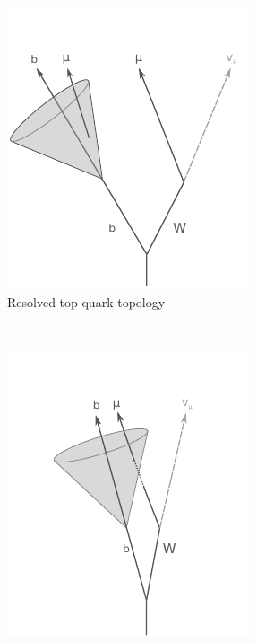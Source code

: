 \begin{figure}[htbp]
  \centering
  \begin{subfigure}[b]{0.45\textwidth}
    \includegraphics[width=\textwidth]{PartBoosted/Plots/NonBoosted.pdf}
    \caption{Resolved top quark topology} \label{fig:NonBoostedDiagram}
  \end{subfigure}%
  ~ 
  \begin{subfigure}[b]{0.45\textwidth}
    \includegraphics[width=\textwidth]{PartBoosted/Plots/Boosted.pdf}

\end{subfigure}
\end{figure}
